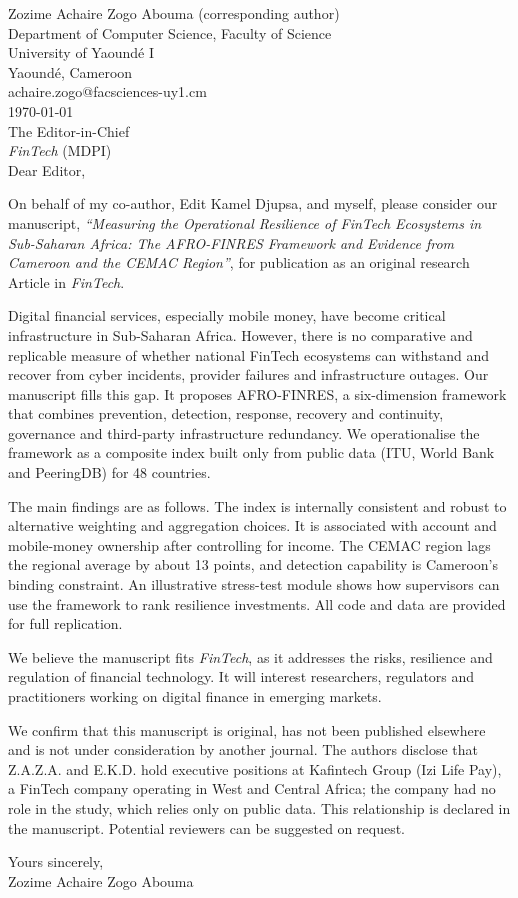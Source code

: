\documentclass[11pt,a4paper]{article}
\begin{document}
\noindent Zozime Achaire Zogo Abouma (corresponding author)\\ Department of Computer Science, Faculty of Science\\ University of Yaound\'e I\\ Yaound\'e, Cameroon\\ achaire.zogo@facsciences-uy1.cm\\[1em]
\today\\[1em]
The Editor-in-Chief\\ \textit{FinTech} (MDPI)\\[1em]
Dear Editor,


On behalf of my co-author, Edit Kamel Djupsa, and myself, please consider our manuscript, \textit{``Measuring the Operational Resilience of FinTech Ecosystems in Sub-Saharan Africa: The AFRO-FINRES Framework and Evidence from Cameroon and the CEMAC Region''}, for publication as an original research Article in \textit{FinTech}.

Digital financial services, especially mobile money, have become critical infrastructure in Sub-Saharan Africa. However, there is no comparative and replicable measure of whether national FinTech ecosystems can withstand and recover from cyber incidents, provider failures and infrastructure outages. Our manuscript fills this gap. It proposes AFRO-FINRES, a six-dimension framework that combines prevention, detection, response, recovery and continuity, governance and third-party infrastructure redundancy. We operationalise the framework as a composite index built only from public data (ITU, World Bank and PeeringDB) for 48 countries.

The main findings are as follows. The index is internally consistent and robust to alternative weighting and aggregation choices. It is associated with account and mobile-money ownership after controlling for income. The CEMAC region lags the regional average by about 13 points, and detection capability is Cameroon's binding constraint. An illustrative stress-test module shows how supervisors can use the framework to rank resilience investments. All code and data are provided for full replication.

We believe the manuscript fits \textit{FinTech}, as it addresses the risks, resilience and regulation of financial technology. It will interest researchers, regulators and practitioners working on digital finance in emerging markets.

We confirm that this manuscript is original, has not been published elsewhere and is not under consideration by another journal. The authors disclose that Z.A.Z.A. and E.K.D. hold executive positions at Kafintech Group (Izi Life Pay), a FinTech company operating in West and Central Africa; the company had no role in the study, which relies only on public data. This relationship is declared in the manuscript. Potential reviewers can be suggested on request.


Yours sincerely,\\[2em]
Zozime Achaire Zogo Abouma
\end{document}
